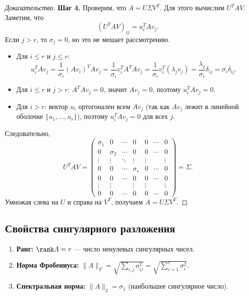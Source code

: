 \documentclass[10pt]{article}
\begin{document}
\begin{proof}[Доказательство]
    \textbf{Шаг 4.} Проверим, что $A = U \Sigma V^T$. Для этого вычислим $U^T A V$. Заметим, что
    \[
    (U^T A V)_{ij} = u_i^T A v_j.
    \]
    Если $j > r$, то $\sigma_j = 0$, но это не мешает рассмотрению.
    \begin{itemize}
        \item Для $i \le r$ и $j \le r$:
        \[
        u_i^T A v_j = \frac{1}{\sigma_i} (A v_i)^T A v_j = \frac{1}{\sigma_i} v_i^T A^T A v_j = \frac{1}{\sigma_i} v_i^T (\lambda_j v_j) = \frac{\lambda_j}{\sigma_i} \delta_{ij} = \sigma_i \delta_{ij}.
        \]
        \item Для $i \le r$ и $j > r$: $A^TA v_j = 0$, значит $A v_j = 0$, поэтому $u_i^T A v_j = 0$.
        \item Для $i > r$: вектор $u_i$ ортогонален всем $A v_j$ (так как $A v_j$ лежит в линейной оболочке $\{u_1,\dots,u_r\}$), поэтому $u_i^T A v_j = 0$ для всех $j$.
    \end{itemize}
    Следовательно,
    \[
    U^T A V = \begin{pmatrix}
    \sigma_1 & 0 & \cdots & 0 & 0 & \cdots & 0\\
    0 & \sigma_2 & \cdots & 0 & 0 & \cdots & 0\\
    \vdots & \vdots & \ddots & \vdots & \vdots & & \vdots\\
    0 & 0 & \cdots & \sigma_r & 0 & \cdots & 0\\
    0 & 0 & \cdots & 0 & 0 & \cdots & 0\\
    \vdots & \vdots & & \vdots & \vdots & & \vdots\\
    0 & 0 & \cdots & 0 & 0 & \cdots & 0
    \end{pmatrix} = \Sigma.
    \]
    Умножая слева на $U$ и справа на $V^T$, получаем $A = U \Sigma V^T$.
\end{proof}

\subsection{Свойства сингулярного разложения}

\begin{enumerate}
    \item \textbf{Ранг:} $\rank A = r$ — число ненулевых сингулярных чисел.
    \item \textbf{Норма Фробениуса:} $\|A\|_F = \sqrt{\sum_{i,j} a_{ij}^2} = \sqrt{\sum_{i=1}^r \sigma_i^2}$.
    \item \textbf{Спектральная норма:} $\|A\|_2 = \sigma_1$ (наибольшее сингулярное число).
\end{enumerate}
\end{document}
